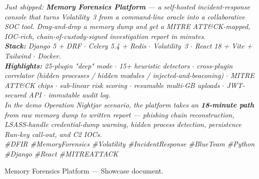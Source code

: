 \documentclass[11pt,a4paper]{article}
\begin{document}
\begin{tcolorbox}[colback=accent!6, colframe=accent, boxrule=0.5pt, arc=2pt]
\small\itshape
Just shipped: \textbf{Memory Forensics Platform} — a self-hosted incident-response
console that turns Volatility~3 from a command-line oracle into a collaborative
SOC tool. Drag-and-drop a memory dump and get a MITRE ATT\&CK-mapped, IOC-rich,
chain-of-custody-signed investigation report in minutes.\\[6pt]
\textbf{Stack:} Django 5 + DRF $\cdot$ Celery 5.4 + Redis $\cdot$ Volatility~3
$\cdot$ React 18 + Vite + Tailwind $\cdot$ Docker.\\[4pt]
\textbf{Highlights:} 25-plugin "deep" mode $\cdot$ 15+ heuristic detectors
$\cdot$ cross-plugin correlator (hidden processes / hidden modules /
injected-and-beaconing) $\cdot$ MITRE ATT\&CK chips $\cdot$ sub-linear risk
scoring $\cdot$ resumable multi-GB uploads $\cdot$ JWT-secured API $\cdot$
immutable audit log.\\[4pt]
In the demo \emph{Operation Nightjar} scenario, the platform takes an
\textbf{18-minute path} from raw memory dump to written report — phishing
chain reconstruction, LSASS-handle credential-dump warning, hidden process
detection, persistence Run-key call-out, and C2 IOCs.\\[6pt]
\#DFIR \#MemoryForensics \#Volatility \#IncidentResponse \#BlueTeam
\#Python \#Django \#React \#MITREATTACK
\end{tcolorbox}

\vfill
\begin{center}\small\color{slate}
Memory Forensics Platform — Showcase document.
\end{center}
\end{document}
